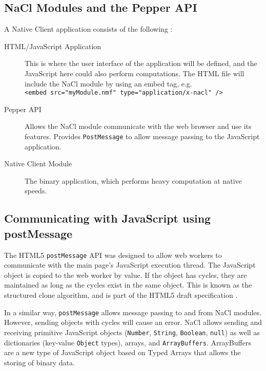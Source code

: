 \subsection{NaCl Modules and the Pepper API} %
\label{sub:nacl_modules_ppapi}
A Native Client application consists of the following \cite{nacloverview}:
\begin{description}
  \item[HTML/JavaScript Application] 
  This is where the user interface of the application will be defined, and the JavaScript here could also perform computations. The HTML file will include   the NaCl module by using an embed tag, e.g. \\
   \lstinline+<embed src="myModule.nmf" type="application/x-nacl" />+
  \item[Pepper API] 
  Allows the NaCl module communicate with the web browser and use its features. Provides \lstinline+PostMessage+ to allow message passing to the JavaScript application.
  \item[Native Client Module] 
  The binary application, which performs heavy computation at native speeds.
\end{description}


\subsection{Communicating with JavaScript using postMessage} %
\label{sub:postmessage_intro}
The HTML5 \lstinline+postMessage+ API was designed to allow web workers to communicate with the main page's JavaScript execution thread. The JavaScript object is copied to the web worker by value. If the object has cycles, they are maintained as long as the cycles exist in the same object. This is known as the structured clone algorithm, and is part of the HTML5 draft specification \cite{html5w3c}. 

In a similar way, \lstinline+postMessage+ allows message passing to and from NaCl modules. However, sending objects with cycles will cause an error. NaCl allows sending and receiving primitive JavaScript objects (\lstinline+Number+, \lstinline+String+, \lstinline+Boolean+, \lstinline+null+) as well as dictionaries (key-value \lstinline+Object+ types), arrays, and \lstinline+ArrayBuffers+. ArrayBuffers are a new type of JavaScript object based on Typed Arrays \cite{typedarraysw3c} that allows the storing of binary data. 

